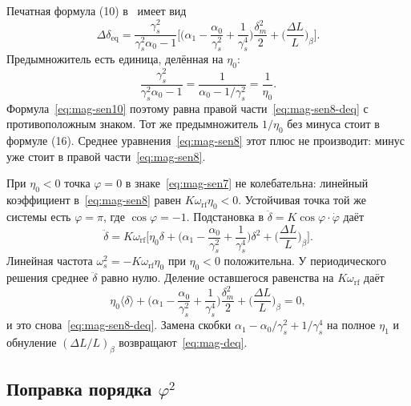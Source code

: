 \documentclass[aps,pra,preprint,a4paper,amsmath,amssymb,longbibliography]{revtex4-2}
\begin{document}
Печатная формула (10) в~\cite{Senichev2013} имеет вид
\begin{equation}
\label{eq:mag-sen10}
\Delta\delta_{\mathrm{eq}}
=
\frac{\gamma_s^2}{\gamma_s^2\alpha_0-1}
\Biggl[
\Biggl(\alpha_1-\frac{\alpha_0}{\gamma_s^2}+\frac{1}{\gamma_s^4}\Biggr)
\frac{\delta_m^2}{2}
+\Biggl(\frac{\Delta L}{L}\Biggr)_{\!\beta}
\Biggr].
\end{equation}
Предымножитель есть единица, делённая на $\eta_0$:
\begin{equation}
\label{eq:mag-prefactor}
\frac{\gamma_s^2}{\gamma_s^2\alpha_0-1}
=\frac{1}{\alpha_0-1/\gamma_s^2}
=\frac{1}{\eta_0}.
\end{equation}
Формула~\eqref{eq:mag-sen10} поэтому равна правой части~\eqref{eq:mag-sen8-deq} с противоположным знаком. Тот же предымножитель $1/\eta_0$ без минуса стоит в формуле (16). Среднее уравнения~\eqref{eq:mag-sen8} этот плюс не производит: минус уже стоит в правой части~\eqref{eq:mag-sen8}.

При $\eta_0<0$ точка $\varphi=0$ в знаке~\eqref{eq:mag-sen7} не колебательна: линейный коэффициент в~\eqref{eq:mag-sen8} равен $K\omega_{\mathrm{rf}}\eta_0<0$. Устойчивая точка той же системы есть $\varphi=\pi$, где $\cos\varphi=-1$. Подстановка в $\ddot\delta=K\cos\varphi\cdot\dot\varphi$ даёт
\begin{equation}
\label{eq:mag-sen-stable}
\ddot\delta
=K\omega_{\mathrm{rf}}
\Biggl[
\eta_0\delta
+\Biggl(\alpha_1-\frac{\alpha_0}{\gamma_s^2}+\frac{1}{\gamma_s^4}\Biggr)\delta^2
+\Biggl(\frac{\Delta L}{L}\Biggr)_{\!\beta}
\Biggr].
\end{equation}
Линейная частота $\omega_s^2=-K\omega_{\mathrm{rf}}\eta_0$ при $\eta_0<0$ положительна. У периодического решения среднее $\ddot\delta$ равно нулю. Деление оставшегося равенства на $K\omega_{\mathrm{rf}}$ даёт
\begin{equation}
\label{eq:mag-sen-stable-avg}
\eta_0\langle\delta\rangle
+\Biggl(\alpha_1-\frac{\alpha_0}{\gamma_s^2}+\frac{1}{\gamma_s^4}\Biggr)\frac{\delta_m^2}{2}
+\Biggl(\frac{\Delta L}{L}\Biggr)_{\!\beta}
=0,
\end{equation}
и это снова~\eqref{eq:mag-sen8-deq}. Замена скобки $\alpha_1-\alpha_0/\gamma_s^2+1/\gamma_s^4$ на полное $\eta_1$ и обнуление $(\Delta L/L)_\beta$ возвращают~\eqref{eq:mag-deq}.

\subsection{Поправка порядка \texorpdfstring{$\varphi^2$}{phi\^2}}
\label{sec:phi2}
\end{document}
